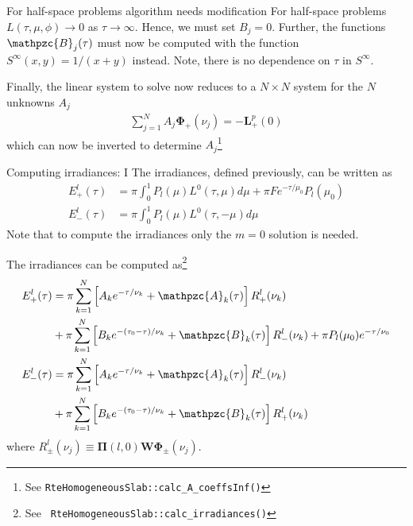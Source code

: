 \documentclass{beamer}
\newcommand{\mvec}[1]{\mathbf{#1}}
\newcommand{\gvec}[1]{\boldsymbol{#1}}
\newcommand{\script}[1]{\mathpzc{#1}}
\begin{document}
\begin{frame}{For half-space problems algorithm needs modification}
  For half-space problems $L(\tau,\mu,\phi) \rightarrow 0$ as $\tau
  \rightarrow \infty$. Hence, we must set $B_j = 0$. Further, the
  functions $\script{B}_j(\tau)$ must now be computed with the
  function $S^\infty(x,y) = 1/(x+y)$ instead. Note, there is no
  dependence on $\tau$ in $S^\infty$.

  Finally, the linear system to solve now reduces to a $N\times N$
  system for the $N$ unknowns $A_j$
  \begin{align}
    \sum_{j=1}^N
      A_j \gvec{\Phi}_+(\nu_j) = -\mvec{L}_+^p(0)
  \end{align}
  which can now be inverted to determine $A_j$\footnote{See
    {\tt RteHomogeneousSlab::calc\_A\_coeffsInf()}}
\end{frame}

\begin{frame}{Computing irradiances: I}
  The irradiances, defined previously, can be written as
  \begin{align}
    E_+^l(\tau) &= \pi \int_0^1
     P_l(\mu) L^0(\tau,\mu) d\mu
    + \pi F e^{-\tau/\mu_0} P_l(\mu_0) \\
    E_-^l(\tau) &= \pi \int_0^1
    P_l(\mu) L^0(\tau,-\mu) d\mu
  \end{align}
  Note that to compute the irradiances only the $m=0$ solution is
  needed. 
\end{frame}

\begin{frame}{The irradiances can be computed as\footnote{See {\tt
        RteHomogeneousSlab::calc\_irradiances()}}}
  \begin{align}
    E_+^l(\tau) &= \pi \sum_{k=1}^N
    \left[
      A_k e^{-\tau/\nu_k} + \script{A}_k(\tau)
    \right] R_+^l(\nu_k) \notag \\
    &+ \pi \sum_{k=1}^N
    \left[
      B_k e^{-(\tau_0-\tau)/\nu_k} + \script{B}_k(\tau)
    \right] R_-^l(\nu_k)
    + \pi P_l(\mu_0) e^{-\tau/\nu_0} \\
    E_-^l(\tau) &= \pi \sum_{k=1}^N
    \left[
      A_k e^{-\tau/\nu_k} + \script{A}_k(\tau)
    \right] R_-^l(\nu_k) \notag \\
    &+ \pi \sum_{k=1}^N
    \left[
      B_k e^{-(\tau_0-\tau)/\nu_k} + \script{B}_k(\tau)
    \right] R_+^l(\nu_k)
  \end{align}
  where $R_\pm^l(\nu_j) \equiv \mvec{\Pi}(l,0) \mvec{W}
  \gvec{\Phi}_\pm(\nu_j)$.
\end{frame}
\end{document}
